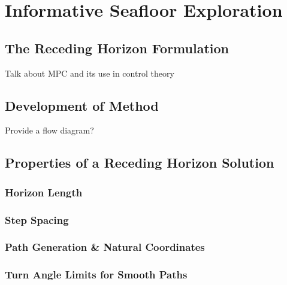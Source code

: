 \chapter{Informative Seafloor Exploration}
\label{Informative-Seafloor-Exploration}

	\section{The Receding Horizon Formulation}
	
		Talk about MPC and its use in control theory
		
	\section{Development of Method}
	
%		
		
		Provide a flow diagram?
		
	\section{Properties of a Receding Horizon Solution}
	
		\subsection{Horizon Length}
		
		\subsection{Step Spacing}
		
		\subsection{Path Generation \& Natural Coordinates}
		
		\subsection{Turn Angle Limits for Smooth Paths}
		
